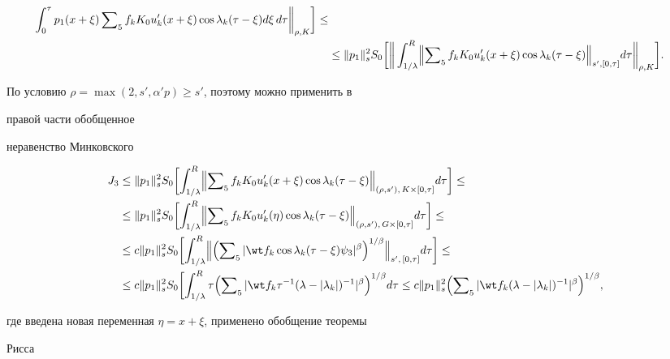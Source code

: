 {\begin{align*}
\int^\tau_0 p_1(x+\xi)\sumn_5 f_k K_0u'_k(x+\xi)


\cos\lambda_k(\tau-\xi)d\xi\,d\tau\biggr\|_{\rho,K}\biggr]\le\\


&\le\|p_1\|^2_s S_0\biggl[\biggr\|\int^R_{1/\lambda}


\Bigl\|\sumn_5 f_k K_0u'_k(x+\xi)\cos\lambda_k(\tau-\xi)


\Bigr\|_{s',[0,\tau]}d\tau\biggr\|_{\rho,K}\biggr].


\end{align*}


По условию $\rho=\max(2,s',\alpha'p)\ge s'$, поэтому можно применить в


правой части обобщенное


неравенство Минковского


\begin{align*}


J_3&\le\|p_1\|^2_s S_0\biggl[\int^R_{1/\lambda}\Bigl\|\sumn_5


f_k K_0u'_k(x+\xi)\cos\lambda_k(\tau-\xi)


\Bigr\|_{(\rho,s'),\,K\times[0,\tau]}d\tau\biggr] \le \\


&\le\|p_1\|^2_s S_0\biggl[\int^R_{1/\lambda}\Bigl\|


\sumn_5 f_k K_0u'_k(\eta)\cos\lambda_k(\tau-\xi)


\Bigr\|_{(\rho,s'),\,G\times[0,\tau]}d\tau\biggr]\le \\


&\le c\|p_1\|^2_s S_0\biggl[\int^R_{1/\lambda}\Bigl\|\Bigl(


\sumn_5|\wt f_k\cos\lambda_k(\tau-\xi)\psi_3|^\beta


\Bigr)^{1/\beta}\Bigr\|_{s',\,[0,\tau]}d\tau\biggr]\le\\


&\le c\|p_1\|^2_s S_0\biggl[\int^R_{1/\lambda}\tau\Bigl(


\sumn_5|\wt f_k\tau^{-1}(\lambda-|\lambda_k|)^{-1}|^\beta


\Bigr)^{1/\beta}d\tau \le


c\|p_1\|^2_s \Bigl(\sumn_5|\wt f_k(\lambda-|\lambda_k|)^{-1}


|^\beta\Bigr)^{1/\beta},


\end{align*}


где введена новая переменная $\eta=x+\xi$, применено обобщение теоремы


Рисса


}

